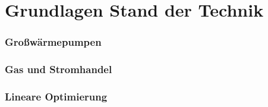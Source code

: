 \chapter{Grundlagen Stand der Technik}
	\label{sec:Grundlagen Stand der Technik}
\subsection{Großwärmepumpen}
	\label{sec:Großwärmepumpe}
\subsection{Gas und Stromhandel}
	\label{sec:Gas und Stromhandel}
\subsection{Lineare Optimierung}
	\label{sec:Lineare Optimierung}